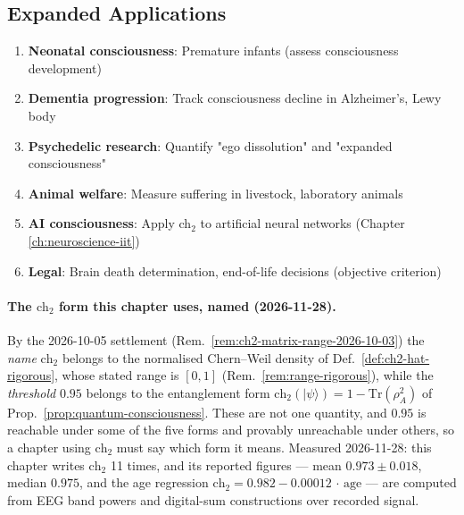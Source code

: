 \subsection{Expanded Applications}

\begin{enumerate}
\item \textbf{Neonatal consciousness}: Premature infants (assess consciousness development)
\item \textbf{Dementia progression}: Track consciousness decline in Alzheimer's, Lewy body
\item \textbf{Psychedelic research}: Quantify "ego dissolution" and "expanded consciousness"
\item \textbf{Animal welfare}: Measure suffering in livestock, laboratory animals
\item \textbf{AI consciousness}: Apply ch$_2$ to artificial neural networks (Chapter \ref{ch:neuroscience-iit})
\item \textbf{Legal}: Brain death determination, end-of-life decisions (objective criterion)
\end{enumerate}

\paragraph{The $\text{ch}_2$ form this chapter uses, named (2026-11-28).}
By the 2026-10-05 settlement (Rem.~\ref{rem:ch2-matrix-range-2026-10-03}) the
\emph{name} $\text{ch}_2$ belongs to the normalised Chern--Weil density of
Def.~\ref{def:ch2-hat-rigorous}, whose stated range is $[0,1]$
(Rem.~\ref{rem:range-rigorous}), while the \emph{threshold} $0.95$ belongs to the
entanglement form $\text{ch}_2(|\psi\rangle) = 1 - \mathrm{Tr}(\rho_A^2)$ of
Prop.~\ref{prop:quantum-consciousness}. These are not one quantity, and $0.95$ is
reachable under some of the five forms and provably unreachable under others, so a
chapter using $\text{ch}_2$ must say which form it means.
Measured 2026-11-28: this chapter writes $\text{ch}_2$ 11 times, and its reported
figures --- mean $0.973 \pm 0.018$, median $0.975$, and the age regression
$\text{ch}_2 = 0.982 - 0.00012\,\cdot\,\text{age}$ --- are computed from EEG band
powers and digital-sum constructions over recorded signal.

